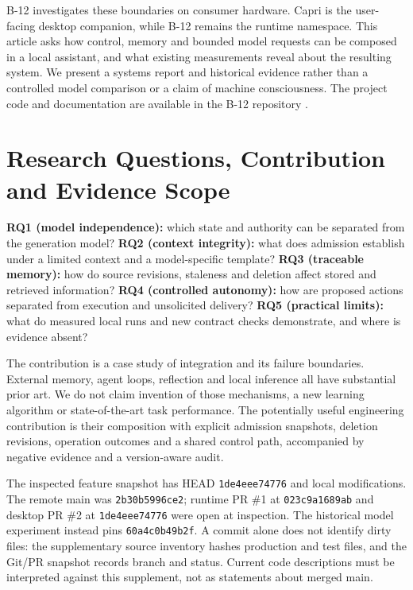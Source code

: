 \documentclass[11pt,a4paper]{article}
\begin{document}
B-12 investigates these boundaries on consumer hardware. Capri is the user-facing desktop companion, while B-12 remains the runtime namespace. This article asks how control, memory and bounded model requests can be composed in a local assistant, and what existing measurements reveal about the resulting system. We present a systems report and historical evidence rather than a controlled model comparison or a claim of machine consciousness. The project code and documentation are available in the B-12 repository \cite{b12}.


\section{Research Questions, Contribution and Evidence Scope}\label{sec:rq}
\textbf{RQ1 (model independence):} which state and authority can be separated from the generation model? \textbf{RQ2 (context integrity):} what does admission establish under a limited context and a model-specific template? \textbf{RQ3 (traceable memory):} how do source revisions, staleness and deletion affect stored and retrieved information? \textbf{RQ4 (controlled autonomy):} how are proposed actions separated from execution and unsolicited delivery? \textbf{RQ5 (practical limits):} what do measured local runs and new contract checks demonstrate, and where is evidence absent?

The contribution is a case study of integration and its failure boundaries. External memory, agent loops, reflection and local inference all have substantial prior art. We do not claim invention of those mechanisms, a new learning algorithm or state-of-the-art task performance. The potentially useful engineering contribution is their composition with explicit admission snapshots, deletion revisions, operation outcomes and a shared control path, accompanied by negative evidence and a version-aware audit.

The inspected feature snapshot has HEAD \texttt{1de4eee74776} and local modifications. The remote main was \texttt{2b30b5996ce2}; runtime PR \#1 at \texttt{023c9a1689ab} and desktop PR \#2 at \texttt{1de4eee74776} were open at inspection. The historical model experiment instead pins \texttt{60a4c0b49b2f}. A commit alone does not identify dirty files: the supplementary source inventory hashes production and test files, and the Git/PR snapshot records branch and status. Current code descriptions must be interpreted against this supplement, not as statements about merged main.
\end{document}
